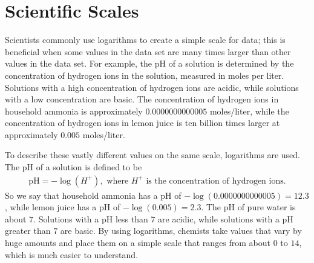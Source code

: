 \documentclass[10pt,]{book}
\theoremstyle{ptxdefinitionnotitle}
\theoremstyle{ptxdefinitiontitle}
\theoremstyle{ptxdefinitionnotitle}
\theoremstyle{ptxdefinitiontitle}
\theoremstyle{ptxdefinitionnotitle}
\theoremstyle{ptxdefinitiontitle}
\numberwithin{equation}{section}
\begin{document}
\section[{Scientific Scales}]{Scientific Scales}\label{chapter05-section02}
\hypertarget{p-307}{}%
Scientists commonly use logarithms to create a simple scale for data; this is beneficial when some values in the data set are many times larger than other values in the data set. For example, the pH of a solution is determined by the concentration of hydrogen ions in the solution, measured in moles per liter. Solutions with a high concentration of hydrogen ions are acidic, while solutions with a low concentration are basic. The concentration of hydrogen ions in household ammonia is approximately \(0.0000000000005\) moles/liter, while the concentration of hydrogen ions in lemon juice is ten billion times larger at approximately \(0.005\) moles/liter.%
\par
\hypertarget{p-308}{}%
To describe these vastly different values on the same scale, logarithms are used. The pH of a solution is defined to be%
\begin{gather*}
\text{pH} = -\log \left( H^{+} \right), \text{ where } H^{+} \text{ is the concentration of hydrogen ions.}
\end{gather*}
So we say that household ammonia has a pH of \(- \log(0.0000000000005) = 12.3\), while lemon juice has a pH of \(- \log(0.005) = 2.3\). The pH of pure water is about \(7\). Solutions with a pH less than \(7\) are acidic, while solutions with a pH greater than \(7\) are basic. By using logarithms, chemists take values that vary by huge amounts and place them on a simple scale that ranges from about \(0\) to \(14\), which is much easier to understand.%
\typeout{************************************************}
\typeout{************************************************}
\end{document}
